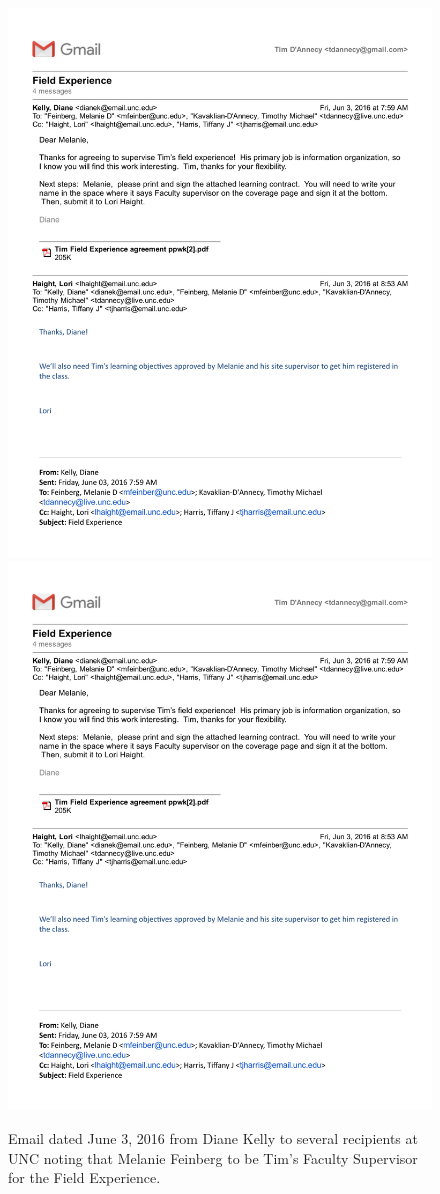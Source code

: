 \begin{figure}
   \centering
       \noindent\includegraphics[page=1,width=.45\textwidth]{documents/2016-06-03-Email-Diane-Kelly.pdf} \hfill 
       \noindent\includegraphics[page=2,width=.45\textwidth]{documents/2016-06-03-Email-Diane-Kelly.pdf}
 \caption{Email dated June 3, 2016 from Diane Kelly to several recipients at UNC noting that Melanie Feinberg to be Tim's Faculty Supervisor for the Field Experience.}
 \label{fig:2016-06-03-Email-Diane-Kelly}
\end{figure}

